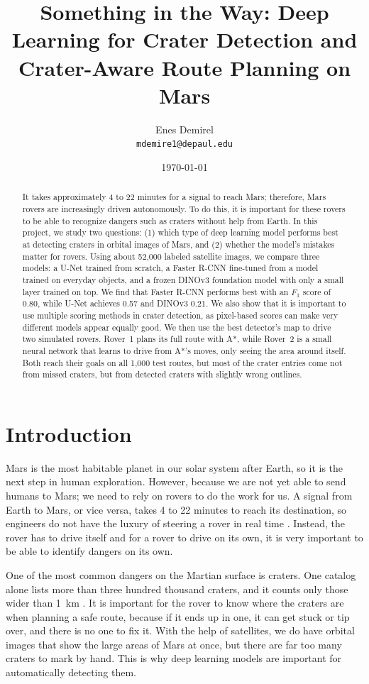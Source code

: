 \documentclass{article} %
\title{Something in the Way: Deep Learning for Crater Detection and Crater-Aware Route Planning on Mars}
\author{Enes Demirel\\
\texttt{mdemire1@depaul.edu} 
}
\date{\today}
\begin{document}
\maketitle

\begin{abstract}
It takes approximately 4 to 22 minutes for a signal to reach Mars; therefore, Mars rovers are increasingly driven autonomously. To do this, it is important for these rovers to be able to recognize dangers such as craters without help from Earth. In this project, we study two questions: (1) which type of deep learning model performs best at detecting craters in orbital images of Mars, and (2) whether the model's mistakes matter for rovers. Using about 52,000 labeled satellite images, we compare three models: a U-Net trained from scratch, a Faster R-CNN fine-tuned from a model trained on everyday objects, and a frozen DINOv3 foundation model with only a small layer trained on top. We find that Faster R-CNN performs best with an $F_1$ score of 0.80, while U-Net achieves 0.57 and DINOv3 0.21. We also show that it is important to use multiple scoring methods in crater detection, as pixel-based scores can make very different models appear equally good. We then use the best detector's map to drive two simulated rovers. Rover~1 plans its full route with A*, while Rover~2 is a small neural network that learns to drive from A*'s moves, only seeing the area around itself. Both reach their goals on all 1,000 test routes, but most of the crater entries come not from missed craters, but from detected craters with slightly wrong outlines.
\end{abstract}

\vspace{-10pt}
\section{Introduction}
\label{sec:introduction}
Mars is the most habitable planet in our solar system after Earth, so it is the next step in human exploration. However, because we are not yet able to send humans to Mars; we need to rely on rovers to do the work for us. A signal from Earth to Mars, or vice versa, takes 4 to 22 minutes to reach its destination, so engineers do not have the luxury of steering a rover in real time \cite{nasa_drive}. Instead, the rover has to drive itself and for a rover to drive on its own, it is very important to be able to identify dangers on its own.

One of the most common dangers on the Martian surface is craters. One catalog alone lists more than three hundred thousand craters, and it counts only those wider than 1~km \cite{robbins2012}. It is important for the rover to know where the craters are when planning a safe route, because if it ends up in one, it can get stuck or tip over, and there is no one to fix it. With the help of satellites, we do have orbital images that show the large areas of Mars at once, but there are far too many craters to mark by hand. This is why deep learning models are important for automatically detecting them.
\end{document}
